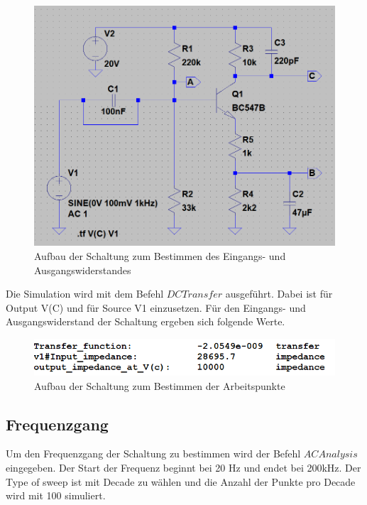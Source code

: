             \begin{figure}[h!]
                \centering
                \includegraphics[width=0.7\linewidth]{322.PNG}
                \caption{Aufbau der Schaltung zum Bestimmen des Eingangs- und Ausgangswiderstandes}
            \end{figure}

            Die Simulation wird mit dem Befehl $DC Transfer$ ausgeführt. Dabei ist für Output V(C) und für Source V1 einzusetzen. Für den Eingangs- und Ausgangswiderstand der Schaltung ergeben sich folgende Werte.

            \begin{figure}[h!]
                \centering
                \includegraphics[width=0.7\linewidth]{3221.PNG}
                \caption{Aufbau der Schaltung zum Bestimmen der Arbeitspunkte}
            \end{figure}

            \newpage
        \subsection{Frequenzgang}
            \label{Frequenz}
            Um den Frequenzgang der Schaltung zu bestimmen wird der Befehl $AC Analysis$ eingegeben. Der Start der Frequenz beginnt bei 20 Hz und endet bei 200kHz. Der Type of sweep ist mit Decade zu wählen und die Anzahl der Punkte pro Decade wird mit 100 simuliert.


